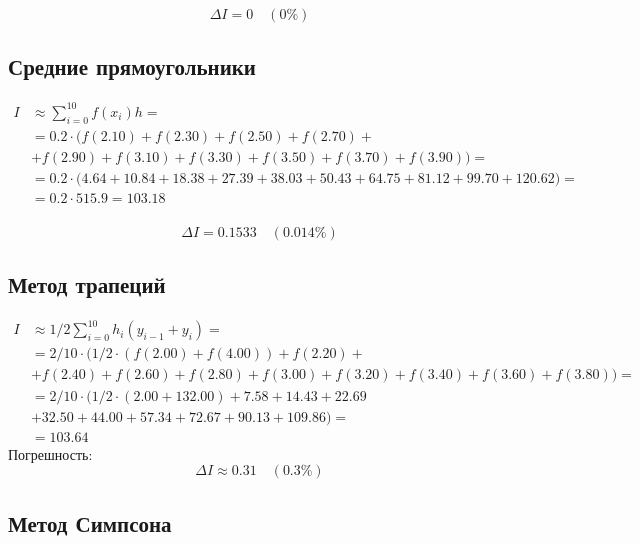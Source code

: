 \[ \Delta I = 0 \quad (0 \%) \]

\subsection{Средние прямоугольники}
\begin{align*}
	I & \approx \sum_{i=0}^10 f(x_i) h =                                                                                  \\
    & = 0.2 \cdot \Big(f(2.10) + f(2.30) + f(2.50) + f(2.70) + \\ &+ f(2.90) + f(3.10) + f(3.30) + f(3.50) + f(3.70) + f(3.90)\Big) = \\
	  & = 0.2 \cdot \Big(4.64 + 10.84 + 18.38 + 27.39 + 38.03 + 50.43 + 64.75 + 81.12 + 99.70 + 120.62\Big) =                     \\
	  & = 0.2 \cdot 515.9 = 103.18                                                                                        \\
\end{align*}

\[ \Delta I = 0.1533 \quad (0.014\%) \]

\subsection{Метод трапеций}
\begin{align*}
	I & \approx 1/2 \sum_{i=0}^{10} h_i (y_{i-1} + y_i) =                                                                                        \\
    & = 2/10 \cdot \Big(1/2 \cdot (f(2.00) + f(4.00)) + f(2.20) + \\ &+ f(2.40) + f(2.60) + f(2.80) + f(3.00) + f(3.20) + f(3.40) + f(3.60) + f(3.80)\Big) = \\
    & = 2/10 \cdot \Big(1/2 \cdot (2.00 + 132.00) + 7.58 + 14.43 + 22.69 \\ &+ 32.50 + 44.00 + 57.34 + 72.67 + 90.13 + 109.86\Big) =                       \\
	  & = 103.64
\end{align*}
Погрешность: \[ \Delta I \approx 0.31 \quad (0.3 \%)  \]

\subsection{Метод Симпсона}

